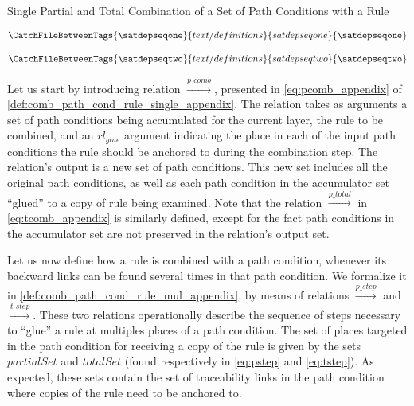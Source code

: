 \begin{definition}{Single Partial and Total Combination of a Set of Path Conditions with a Rule\\}
\label{def:comb_path_cond_rule_single_appendix}

\begin{align}
\label{eq:pcomb_appendix}
\CatchFileBetweenTags{\satdepseqone}{text/definitions}{satdepseqone}{\satdepseqone}
\end{align}


\begin{align}
\label{eq:tcomb_appendix}
\CatchFileBetweenTags{\satdepseqtwo}{text/definitions}{satdepseqtwo}{\satdepseqtwo}
\end{align}

\end{definition}


Let us start by introducing relation $\stackrel{p\_comb}{\rightarrow}$, presented in \cref{eq:pcomb_appendix} of \cref{def:comb_path_cond_rule_single_appendix}. The relation takes as arguments a set of path conditions being accumulated for the current layer, the rule to be combined, and an $rl_{glue}$ argument indicating the place in each of the input path conditions the rule should be anchored to during the combination step. The relation's output is a new set of path conditions. This new set includes all the original path conditions, as well as each path condition in the accumulator set ``glued'' to a copy of rule being examined. Note that the relation $\stackrel{p\_total}{\rightarrow}$ in \cref{eq:tcomb_appendix} is similarly defined, except for the fact path conditions in the accumulator set are not preserved in the relation's output set.\\

\setcounter{equation}{0} 

Let us now define how a rule is combined with a path condition, whenever its backward links can be found several times in that path condition. We formalize it in \cref{def:comb_path_cond_rule_mul_appendix}, by means of relations $\stackrel{p\_step}{\rightarrow}$ and $\stackrel{t\_step}{\rightarrow}$. These two relations operationally describe the sequence of steps necessary to ``glue'' a rule at multiples places of a path condition. The set of places targeted in the path condition for receiving a copy of the rule is given by the sets $partialSet$ and $totalSet$ (found respectively in \cref{eq:pstep} and \cref{eq:tstep}). As expected, these sets contain the set of traceability links in the path condition where copies of the rule need to be anchored to.

